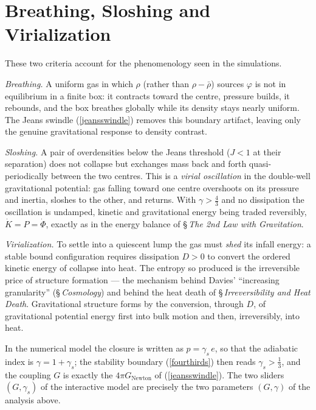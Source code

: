 \section{Breathing, Sloshing and Virialization}

These two criteria account for the phenomenology seen in the simulations.

\emph{Breathing.} A uniform gas in which $\rho$ (rather than $\rho-\bar\rho$)
sources $\varphi$ is not in equilibrium in a finite box: it contracts toward the
centre, pressure builds, it rebounds, and the box breathes globally while its
density stays nearly uniform. The Jeans swindle (\ref{jeansswindle}) removes
this boundary artifact, leaving only the genuine gravitational response to
density contrast.

\emph{Sloshing.} A pair of overdensities below the Jeans threshold
($J<1$ at their separation) does not collapse but exchanges mass back and forth
quasi-periodically between the two centres. This is a \emph{virial oscillation}
in the double-well gravitational potential: gas falling toward one centre
overshoots on its pressure and inertia, sloshes to the other, and returns. With
$\gamma>\tfrac43$ and no dissipation the oscillation is undamped, kinetic and
gravitational energy being traded reversibly, $\dot K=P=\dot\Phi$, exactly as in
the energy balance of \S\,\textit{The 2nd Law with Gravitation}.

\emph{Virialization.} To settle into a quiescent lump the gas must \emph{shed}
its infall energy: a stable bound configuration requires dissipation $D>0$ to
convert the ordered kinetic energy of collapse into heat. The entropy so
produced is the irreversible price of structure formation --- the mechanism
behind Davies' ``increasing granularity'' (\S\,\textit{Cosmology}) and behind
the heat death of \S\,\textit{Irreversibility and Heat Death}. Gravitational
structure forms by the conversion, through $D$, of gravitational potential
energy first into bulk motion and then, irreversibly, into heat.

\begin{remark}
In the numerical model the closure is written as $p=\gamma_s\,e$, so that the
adiabatic index is $\gamma=1+\gamma_s$; the stability boundary (\ref{fourthirds})
then reads $\gamma_s>\tfrac13$, and the coupling $G$ is exactly the
$4\pi G_{\mathrm{Newton}}$ of (\ref{jeansswindle}). The two sliders $(G,\gamma_s)$
of the interactive model are precisely the two parameters $(G,\gamma)$ of the
analysis above.
\end{remark}

